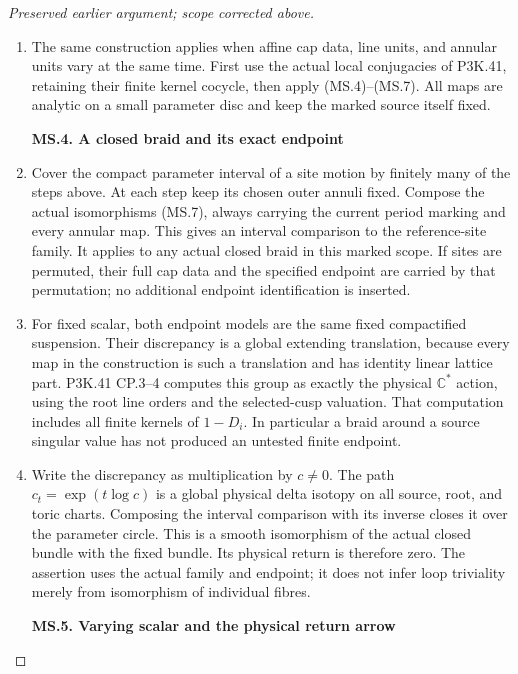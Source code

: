 \begin{proof}[Preserved earlier argument; scope corrected above]
\begin{enumerate}[label=\arabic*.]
\item The same construction applies when affine cap data, line units, and
annular units vary at the same time. First use the actual local
conjugacies of P3K.41, retaining their finite kernel cocycle, then
apply (MS.4)--(MS.7). All maps are analytic on a small parameter disc
and keep the marked source itself fixed.

\par

\medskip\noindent\textbf{MS.4. A closed braid and its exact endpoint}

\par\nobreak

\item Cover the compact parameter interval of a site motion by finitely many
of the steps above. At each step keep its chosen outer annuli fixed.
Compose the actual isomorphisms (MS.7), always carrying the current
period marking and every annular map. This gives an interval
comparison to the reference-site family. It applies to any actual
closed braid in this marked scope. If sites are permuted, their full
cap data and the specified endpoint are carried by that permutation;
no additional endpoint identification is inserted.

\item For fixed scalar, both endpoint models are the same fixed compactified
suspension. Their discrepancy is a global extending translation,
because every map in the construction is such a translation and
has identity linear lattice part. P3K.41 CP.3--4 computes this group
as exactly the physical \(\mathbb C^*\) action, using the root
line orders and the selected-cusp valuation. That computation includes
all finite kernels of \(1-D_i\). In particular a braid around
a source singular value has not produced an untested finite endpoint.

\item Write the discrepancy as multiplication by \(c\ne0\). The
path \(c_t=\exp(t\log c)\) is a global physical delta isotopy
on all source, root, and toric charts. Composing the interval
comparison with its inverse closes it over the parameter circle.
This is a smooth isomorphism of the actual closed bundle with the
fixed bundle. Its physical return is therefore zero. The assertion
uses the actual family and endpoint; it does not infer loop
triviality merely from isomorphism of individual fibres.

\par

\medskip\noindent\textbf{MS.5. Varying scalar and the physical return arrow}


\end{enumerate}
\end{proof}
